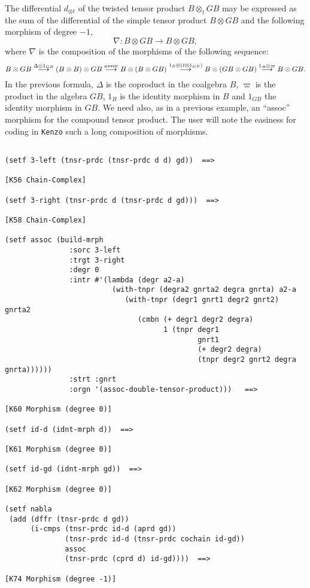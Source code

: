 The differential $d_{\otimes t}$ of the twisted tensor product $B \otimes_t GB$ may be expressed as the sum
of the differential of the simple tensor product $B \otimes GB$ and the following morphism of degree $-1$,
$$\nabla: B \otimes GB \longrightarrow B \otimes GB,$$
where $\nabla$ is the composition of the morphisms of the following sequence:
$$B\otimes GB \buildrel {\Delta\otimes 1_{GB}} \over \longrightarrow  (B\otimes B) \otimes GB
              \buildrel {assoc} \over \longrightarrow  B \otimes (B \otimes GB)
              \buildrel {1_B \otimes (t \otimes 1_{GB})} \over \longrightarrow  B \otimes (GB \otimes GB)
              \buildrel {1_B \otimes \varpi} \over \longrightarrow B \otimes GB.$$
In the previous formula, $\Delta$ is the coproduct in the coalgebra $B$, $\varpi$ is the
product in the algebra $GB$, $1_B$ is the identity morphism in $B$ and $1_{GB}$ the identity morphism
in $GB$. We need also, as in a previous example, an ``assoc'' morphism for
the compound tensor product. The user will note the easiness for coding in {\tt Kenzo} such
a long composition of morphisms.
{\footnotesize\begin{verbatim}

(setf 3-left (tnsr-prdc (tnsr-prdc d d) gd))  ==>

[K56 Chain-Complex]

(setf 3-right (tnsr-prdc d (tnsr-prdc d gd)))  ==>

[K58 Chain-Complex]

(setf assoc (build-mrph
               :sorc 3-left
               :trgt 3-right
               :degr 0
               :intr #'(lambda (degr a2-a)
                         (with-tnpr (degra2 gnrta2 degra gnrta) a2-a
                            (with-tnpr (degr1 gnrt1 degr2 gnrt2) gnrta2
                               (cmbn (+ degr1 degr2 degra)
                                     1 (tnpr degr1
                                             gnrt1
                                             (+ degr2 degra)
                                             (tnpr degr2 gnrt2 degra gnrta))))))
               :strt :gnrt
               :orgn '(assoc-double-tensor-product)))   ==>

[K60 Morphism (degree 0)]

(setf id-d (idnt-mrph d))  ==>

[K61 Morphism (degree 0)]

(setf id-gd (idnt-mrph gd))  ==>

[K62 Morphism (degree 0)]

(setf nabla
 (add (dffr (tnsr-prdc d gd))
      (i-cmps (tnsr-prdc id-d (aprd gd))
              (tnsr-prdc id-d (tnsr-prdc cochain id-gd))
              assoc
              (tnsr-prdc (cprd d) id-gd))))  ==>

[K74 Morphism (degree -1)]
\end{verbatim}}
